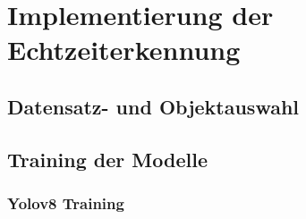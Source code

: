 
\chapter{Implementierung der Echtzeiterkennung}



\section{Datensatz- und Objektauswahl}




\section{Training der Modelle}

\subsection{Yolov8 Training}

















